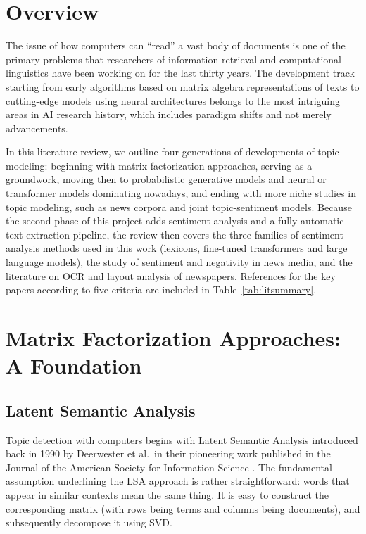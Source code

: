 \section{Overview}

The issue of how computers can ``read'' a vast body of documents is one of the primary problems that researchers of information retrieval and computational linguistics have been working on for the last thirty years. The development track starting from early algorithms based on matrix algebra representations of texts to cutting-edge models using neural architectures belongs to the most intriguing areas in AI research history, which includes paradigm shifts and not merely advancements.

In this literature review, we outline four generations of developments of topic modeling: beginning with matrix factorization approaches, serving as a groundwork, moving then to probabilistic generative models and neural or transformer models dominating nowadays, and ending with more niche studies in topic modeling, such as news corpora and joint topic-sentiment models. Because the second phase of this project adds sentiment analysis and a fully automatic text-extraction pipeline, the review then covers the three families of sentiment analysis methods used in this work (lexicons, fine-tuned transformers and large language models), the study of sentiment and negativity in news media, and the literature on OCR and layout analysis of newspapers. References for the key papers according to five criteria are included in Table~\ref{tab:litsummary}.

\section{Matrix Factorization Approaches: A Foundation}

\subsection{Latent Semantic Analysis}
Topic detection with computers begins with Latent Semantic Analysis introduced back in 1990 by Deerwester et al.\ in their pioneering work published in the Journal of the American Society for Information Science \cite{deerwester1990}. The fundamental assumption underlining the LSA approach is rather straightforward: words that appear in similar contexts mean the same thing. It is easy to construct the corresponding matrix (with rows being terms and columns being documents), and subsequently decompose it using SVD.

